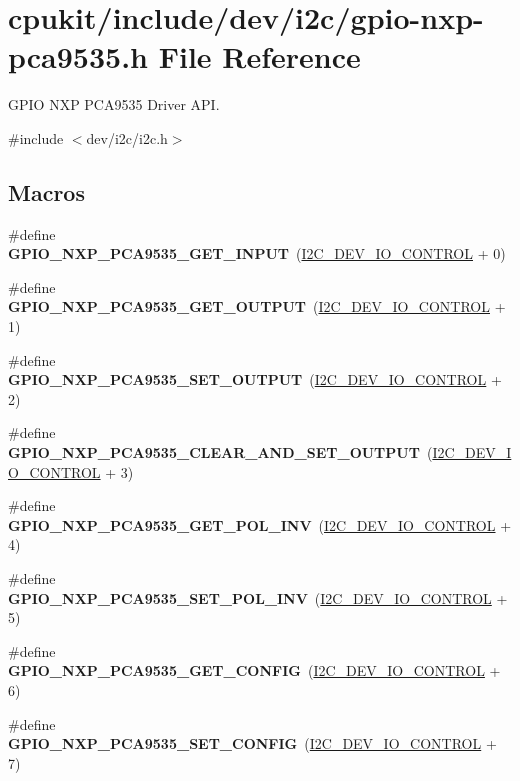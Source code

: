 \hypertarget{gpio-nxp-pca9535_8h}{}\section{cpukit/include/dev/i2c/gpio-\/nxp-\/pca9535.h File Reference}
\label{gpio-nxp-pca9535_8h}


G\+P\+IO N\+XP P\+C\+A9535 Driver A\+PI.  


{\ttfamily \#include $<$dev/i2c/i2c.\+h$>$}\newline
\subsection*{Macros}
\begin{DoxyCompactItemize}
\item 
\#define {\bfseries G\+P\+I\+O\+\_\+\+N\+X\+P\+\_\+\+P\+C\+A9535\+\_\+\+G\+E\+T\+\_\+\+I\+N\+P\+UT}~(\mbox{\hyperlink{group__I2CDevice_gae8b74d1b5fc16a9c31e4da115b0ab004}{I2\+C\+\_\+\+D\+E\+V\+\_\+\+I\+O\+\_\+\+C\+O\+N\+T\+R\+OL}} + 0)
\item 
\#define {\bfseries G\+P\+I\+O\+\_\+\+N\+X\+P\+\_\+\+P\+C\+A9535\+\_\+\+G\+E\+T\+\_\+\+O\+U\+T\+P\+UT}~(\mbox{\hyperlink{group__I2CDevice_gae8b74d1b5fc16a9c31e4da115b0ab004}{I2\+C\+\_\+\+D\+E\+V\+\_\+\+I\+O\+\_\+\+C\+O\+N\+T\+R\+OL}} + 1)
\item 
\#define {\bfseries G\+P\+I\+O\+\_\+\+N\+X\+P\+\_\+\+P\+C\+A9535\+\_\+\+S\+E\+T\+\_\+\+O\+U\+T\+P\+UT}~(\mbox{\hyperlink{group__I2CDevice_gae8b74d1b5fc16a9c31e4da115b0ab004}{I2\+C\+\_\+\+D\+E\+V\+\_\+\+I\+O\+\_\+\+C\+O\+N\+T\+R\+OL}} + 2)
\item 
\#define {\bfseries G\+P\+I\+O\+\_\+\+N\+X\+P\+\_\+\+P\+C\+A9535\+\_\+\+C\+L\+E\+A\+R\+\_\+\+A\+N\+D\+\_\+\+S\+E\+T\+\_\+\+O\+U\+T\+P\+UT}~(\mbox{\hyperlink{group__I2CDevice_gae8b74d1b5fc16a9c31e4da115b0ab004}{I2\+C\+\_\+\+D\+E\+V\+\_\+\+I\+O\+\_\+\+C\+O\+N\+T\+R\+OL}} + 3)
\item 
\#define {\bfseries G\+P\+I\+O\+\_\+\+N\+X\+P\+\_\+\+P\+C\+A9535\+\_\+\+G\+E\+T\+\_\+\+P\+O\+L\+\_\+\+I\+NV}~(\mbox{\hyperlink{group__I2CDevice_gae8b74d1b5fc16a9c31e4da115b0ab004}{I2\+C\+\_\+\+D\+E\+V\+\_\+\+I\+O\+\_\+\+C\+O\+N\+T\+R\+OL}} + 4)
\item 
\#define {\bfseries G\+P\+I\+O\+\_\+\+N\+X\+P\+\_\+\+P\+C\+A9535\+\_\+\+S\+E\+T\+\_\+\+P\+O\+L\+\_\+\+I\+NV}~(\mbox{\hyperlink{group__I2CDevice_gae8b74d1b5fc16a9c31e4da115b0ab004}{I2\+C\+\_\+\+D\+E\+V\+\_\+\+I\+O\+\_\+\+C\+O\+N\+T\+R\+OL}} + 5)
\item 
\#define {\bfseries G\+P\+I\+O\+\_\+\+N\+X\+P\+\_\+\+P\+C\+A9535\+\_\+\+G\+E\+T\+\_\+\+C\+O\+N\+F\+IG}~(\mbox{\hyperlink{group__I2CDevice_gae8b74d1b5fc16a9c31e4da115b0ab004}{I2\+C\+\_\+\+D\+E\+V\+\_\+\+I\+O\+\_\+\+C\+O\+N\+T\+R\+OL}} + 6)
\item 
\#define {\bfseries G\+P\+I\+O\+\_\+\+N\+X\+P\+\_\+\+P\+C\+A9535\+\_\+\+S\+E\+T\+\_\+\+C\+O\+N\+F\+IG}~(\mbox{\hyperlink{group__I2CDevice_gae8b74d1b5fc16a9c31e4da115b0ab004}{I2\+C\+\_\+\+D\+E\+V\+\_\+\+I\+O\+\_\+\+C\+O\+N\+T\+R\+OL}} + 7)
\end{DoxyCompactItemize}
